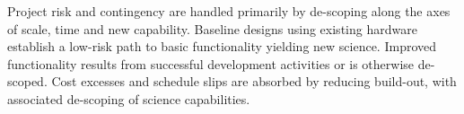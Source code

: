 \documentclass[preprint]{aastex}
\begin{document}
Project risk and contingency are handled primarily by de-scoping along the axes of scale, time and new capability.  Baseline designs using
existing hardware establish a low-risk path to basic functionality yielding new science.  Improved functionality
results from successful development activities or is otherwise de-scoped.
Cost excesses and schedule slips are absorbed by reducing
build-out, with associated de-scoping of science capabilities.


\clearpage
\setcounter{page}{1}
\thispagestyle{empty}
%
%


\end{document}
